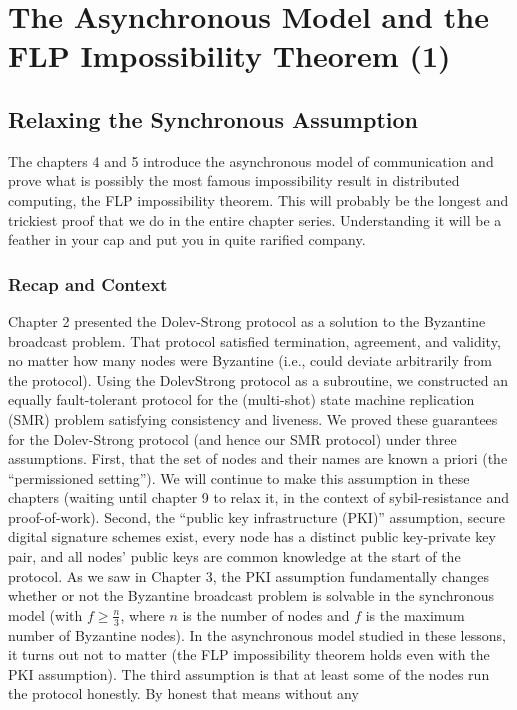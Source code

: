 \chapter{The Asynchronous Model and the FLP Impossibility Theorem (1)}
\section{Relaxing the Synchronous Assumption}
The chapters 4 and 5 introduce the asynchronous model of communication and prove what is possibly the most famous impossibility result in distributed computing, the FLP impossibility
theorem. This will probably be the longest and trickiest proof that we do in the entire chapter
series. Understanding it will be a feather in your cap and put you in quite rarified company.


\subsection{Recap and Context}
Chapter 2 presented the Dolev-Strong protocol as a solution to the Byzantine broadcast
problem. That protocol satisfied termination, agreement, and validity, no matter how many
nodes were Byzantine (i.e., could deviate arbitrarily from the protocol). Using the DolevStrong protocol as a subroutine,
we constructed an equally fault-tolerant protocol for the (multi-shot) state machine replication (SMR) problem satisfying consistency and liveness.
We proved these guarantees for the Dolev-Strong protocol (and hence our SMR protocol)
under three assumptions. First, that the set of nodes and their names are known a priori
(the “permissioned setting”). We will continue to make this assumption in these chapters
(waiting until chapter 9 to relax it, in the context of sybil-resistance and proof-of-work).
Second, the “public key infrastructure (PKI)” assumption, secure digital signature schemes
exist, every node has a distinct public key-private key pair, and all nodes’ public keys are
common knowledge at the start of the protocol. As we saw in Chapter 3, the PKI assumption
fundamentally changes whether or not the Byzantine broadcast problem is solvable in the
synchronous model (with $f \geq \frac{n}{3}$, where $n$ is the number of nodes and $f$ is the maximum
number of Byzantine nodes). In the asynchronous model studied in these lessons, it turns
out not to matter (the FLP impossibility theorem holds even with the PKI assumption).
The third assumption is  that at least some
of the nodes run the protocol honestly.
By honest that means without any
